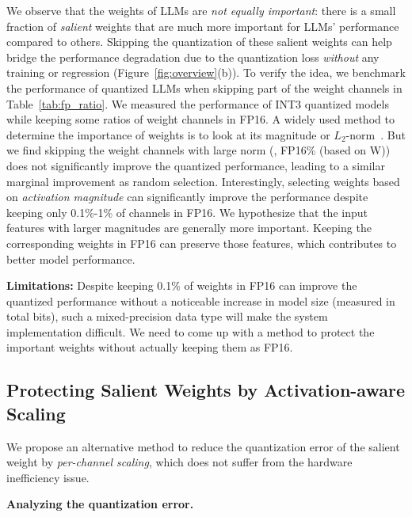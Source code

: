We observe that the weights of LLMs are \emph{not equally important}: there is a small fraction of \emph{salient} weights that are much more important for LLMs' performance compared to others. Skipping the quantization of these salient weights can help bridge the performance degradation due to the quantization loss \emph{without} any training or regression (Figure~\ref{fig:overview}(b)).
To verify the idea, we benchmark the performance of quantized LLMs when skipping part of the weight channels in Table~\ref{tab:fp_ratio}. We measured the performance of INT3 quantized models while keeping some ratios of weight channels in FP16. A widely used method to determine the importance of weights is to look at its magnitude or $L_2$-norm~\cite{han2015learning, frankle2018lottery}. But we find skipping the weight channels with large norm (\ie, FP16\% (based on W)) does not significantly improve the quantized performance, leading to a similar marginal improvement as random selection. 
Interestingly, selecting weights based on \emph{activation magnitude} can significantly improve the performance despite keeping only 0.1\%-1\% of channels in FP16. 
We hypothesize that the input features with larger magnitudes are generally more important. Keeping the corresponding weights in FP16 can preserve those features, which contributes to better model performance. 

\textbf{Limitations: }
Despite keeping 0.1\% of weights in FP16 can improve the quantized performance without a noticeable increase in model size (measured in total bits), such a mixed-precision data type will make the system implementation difficult. We need to come up with a method to protect the important weights without actually keeping them as FP16. 

\subsection{Protecting Salient Weights by Activation-aware Scaling}
We propose an alternative method to reduce the quantization error of the salient weight by \emph{per-channel scaling}, which does not suffer from the hardware inefficiency issue. 

\textbf{Analyzing the quantization error.}

